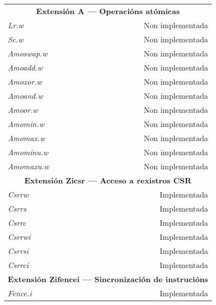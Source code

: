 \begin{longtable}{l|r}
    \multicolumn{2}{c}{\textbf{Extensión A — Operacións atómicas}} \\
    \textit{Lr.w} & Non implementada \\
    \textit{Sc.w} & Non implementada \\
    \textit{Amoswap.w} & Non implementada \\
    \textit{Amoadd.w} & Non implementada \\
    \textit{Amoxor.w} & Non implementada \\
    \textit{Amoand.w} & Non implementada \\
    \textit{Amoor.w} & Non implementada \\
    \textit{Amomin.w} & Non implementada \\
    \textit{Amomax.w} & Non implementada \\
    \textit{Amominu.w} & Non implementada \\
    \textit{Amomaxu.w} & Non implementada \\

    \multicolumn{2}{c}{\textbf{Extensión Zicsr — Acceso a rexistros CSR}} \\
    \textit{Csrrw} & Implementada \\
    \textit{Csrrs} & Implementada \\
    \textit{Csrrc} & Implementada \\
    \textit{Csrrwi} & Implementada \\
    \textit{Csrrsi} & Implementada \\
    \textit{Csrrci} & Implementada \\

    \multicolumn{2}{c}{\textbf{Extensión Zifencei — Sincronización de instrucións}} \\
    \textit{Fence.i} & Implementada \\
\end{longtable}
